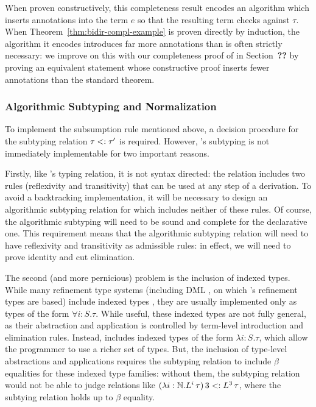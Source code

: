 When proven constructively, this completeness result encodes an algorithm which inserts annotations into the term $e$ so that the resulting term checks against $\tau$. When Theorem~\ref{thm:bidir-compl-example} is proven directly by induction, the algorithm it encodes introduces far more annotations than is often strictly necessary: we improve on this with our completeness proof of \bilambdaamor in Section~\textbf{??} by proving an equivalent statement whose constructive proof inserts fewer annotations than the standard theorem.

\subsubsection{Algorithmic Subtyping and Normalization}
To implement the subsumption rule mentioned above, a decision procedure for the subtyping relation $\tau <: \tau'$ is required. However, \dlambdaamor's subtyping is not immediately implementable for two important reasons.

Firstly, like \dlambdaamor's typing relation, it is not syntax directed: the relation includes two rules (reflexivity and transitivity) that can be used at any step of a derivation. To avoid a backtracking implementation, it will be necessary to design an algorithmic subtyping relation for \bilambdaamor which includes neither of these rules. Of course, the algorithmic subtyping will need to be sound and complete for the declarative one. This requirement means that the algorithmic subtyping relation will need to have reflexivity and transitivity as admissible rules: in effect, we will need to prove identity and cut elimination.

The second (and more pernicious) problem is the inclusion of indexed types. While many refinement type systems (including DML \cite{xi:jfp07}, on which \lambdaamor's refinement types are based) include indexed types \cite{zenger:tcs97}, they are usually implemented only as types of the form $\forall i : S. \tau$. While useful, these indexed types are not fully general, as their abstraction and application is controlled by term-level introduction and elimination rules. Instead, \dlambdaamor includes indexed types of the form $\lambda i : S. \tau$, which allow the programmer to use a richer set of types. But, the inclusion of type-level abstractions and applications requires the subtyping relation to include $\beta$ equalities for these indexed type families: without them, the subtyping relation would not be able to judge relations like $(\lambda i : \mathbb{N}. L^i\, \tau) \, 3 <: L^3 \, \tau$, where the subtying relation holds up to $\beta$ equality.

